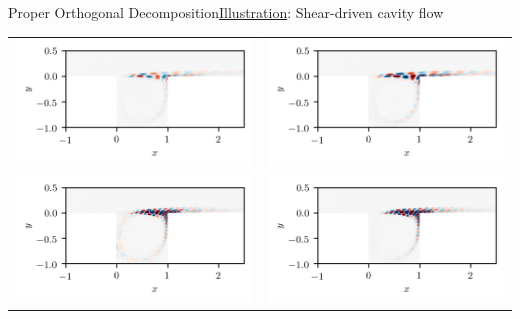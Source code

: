\documentclass[usenames,dvipsnames,svgnames,10pt,aspectratio=169]{beamer}
\begin{document}
\begin{frame}{Proper Orthogonal Decomposition}{\underline{Illustration}: Shear-driven cavity flow}
	\centering
	\begin{tabular}{cc}
		\includegraphics[width=.4\textwidth]{PCA_mode_0} & \includegraphics[width=.4\textwidth]{PCA_mode_1} \\
		\includegraphics[width=.4\textwidth]{PCA_mode_2} & \includegraphics[width=.4\textwidth]{PCA_mode_3}
	\end{tabular}
\end{frame}
\end{document}
